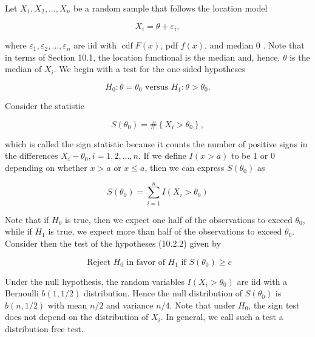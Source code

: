 Let $X_{1}, X_{2}, \ldots, X_{n}$ be a random sample that follows the location model


\begin{equation*}
X_{i}=\theta+\varepsilon_{i}, \tag{10.2.1}
\end{equation*}


where $\varepsilon_{1}, \varepsilon_{2}, \ldots, \varepsilon_{n}$ are iid with $\operatorname{cdf} F(x)$, pdf $f(x)$, and median 0 . Note that in terms of Section 10.1, the location functional is the median and, hence, $\theta$ is the median of $X_{i}$. We begin with a test for the one-sided hypotheses


\begin{equation*}
H_{0}: \theta=\theta_{0} \text { versus } H_{1}: \theta>\theta_{0} . \tag{10.2.2}
\end{equation*}


Consider the statistic


\begin{equation*}
S\left(\theta_{0}\right)=\#\left\{X_{i}>\theta_{0}\right\}, \tag{10.2.3}
\end{equation*}


which is called the sign statistic because it counts the number of positive signs in the differences $X_{i}-\theta_{0}, i=1,2, \ldots, n$. If we define $I(x>a)$ to be 1 or 0 depending on whether $x>a$ or $x \leq a$, then we can express $S\left(\theta_{0}\right)$ as


\begin{equation*}
S\left(\theta_{0}\right)=\sum_{i=1}^{n} I\left(X_{i}>\theta_{0}\right) \tag{10.2.4}
\end{equation*}


Note that if $H_{0}$ is true, then we expect one half of the observations to exceed $\theta_{0}$, while if $H_{1}$ is true, we expect more than half of the observations to exceed $\theta_{0}$. Consider then the test of the hypotheses (10.2.2) given by


\begin{equation*}
\text { Reject } H_{0} \text { in favor of } H_{1} \text { if } S\left(\theta_{0}\right) \geq c \tag{10.2.5}
\end{equation*}


Under the null hypothesis, the random variables $I\left(X_{i}>\theta_{0}\right)$ are iid with a Bernoulli $b(1,1 / 2)$ distribution. Hence the null distribution of $S\left(\theta_{0}\right)$ is $b(n, 1 / 2)$ with mean $n / 2$ and variance $n / 4$. Note that under $H_{0}$, the sign test does not depend on the distribution of $X_{i}$. In general, we call such a test a distribution free test.


